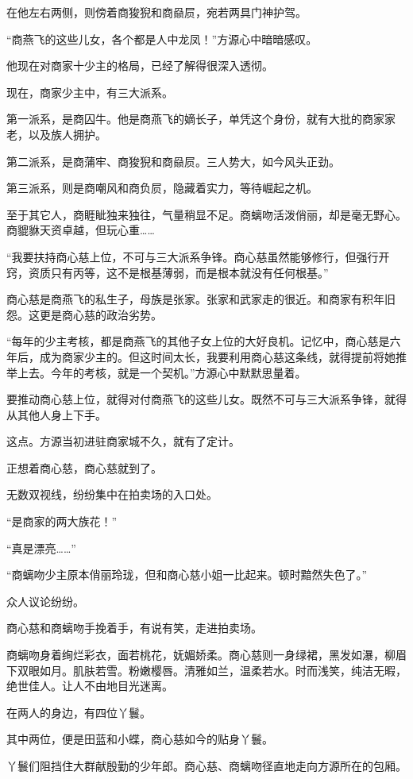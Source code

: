\begin{this_body}
在他左右两侧，则傍着商狻猊和商赑屃，宛若两具门神护驾。

“商燕飞的这些儿女，各个都是人中龙凤！”方源心中暗暗感叹。

他现在对商家十少主的格局，已经了解得很深入透彻。

现在，商家少主中，有三大派系。

第一派系，是商囚牛。他是商燕飞的嫡长子，单凭这个身份，就有大批的商家家老，以及族人拥护。

第二派系，是商蒲牢、商狻猊和商赑屃。三人势大，如今风头正劲。

第三派系，则是商嘲风和商负屃，隐藏着实力，等待崛起之机。

至于其它人，商睚眦独来独往，气量稍显不足。商螭吻活泼俏丽，却是毫无野心。商貔貅天资卓越，但玩心重……

“我要扶持商心慈上位，不可与三大派系争锋。商心慈虽然能够修行，但强行开窍，资质只有丙等，这不是根基薄弱，而是根本就没有任何根基。”

商心慈是商燕飞的私生子，母族是张家。张家和武家走的很近。和商家有积年旧怨。这更是商心慈的政治劣势。

“每年的少主考核，都是商燕飞的其他子女上位的大好良机。记忆中，商心慈是六年后，成为商家少主的。但这时间太长，我要利用商心慈这条线，就得提前将她推举上去。今年的考核，就是一个契机。”方源心中默默思量着。

要推动商心慈上位，就得对付商燕飞的这些儿女。既然不可与三大派系争锋，就得从其他人身上下手。

这点。方源当初进驻商家城不久，就有了定计。

正想着商心慈，商心慈就到了。

无数双视线，纷纷集中在拍卖场的入口处。

“是商家的两大族花！”

“真是漂亮……”

“商螭吻少主原本俏丽玲珑，但和商心慈小姐一比起来。顿时黯然失色了。”

众人议论纷纷。

商心慈和商螭吻手挽着手，有说有笑，走进拍卖场。

商螭吻身着绚烂彩衣，面若桃花，妩媚娇柔。商心慈则一身绿裙，黑发如瀑，柳眉下双眼如月。肌肤若雪。粉嫩樱唇。清雅如兰，温柔若水。时而浅笑，纯洁无暇，绝世佳人。让人不由地目光迷离。

在两人的身边，有四位丫鬟。

其中两位，便是田蓝和小蝶，商心慈如今的贴身丫鬟。

丫鬟们阻挡住大群献殷勤的少年郎。商心慈、商螭吻径直地走向方源所在的包厢。


\end{this_body}
